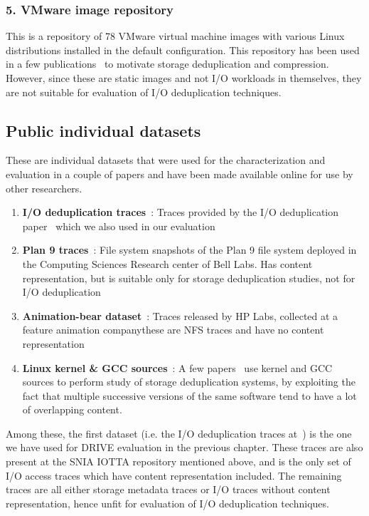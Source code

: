 \subsubsection{5. VMware image repository}
This is a repository of 78 VMware virtual machine images with various
Linux distributions installed in the default configuration. This 
repository has been used in a few publications~\cite{p-dedupe, ddelta} to
motivate storage deduplication and compression. However, since these
are static images and not I/O workloads in themselves, they are not
suitable for evaluation of I/O deduplication techniques.

\subsection{Public individual datasets}
These are individual datasets that were used for the 
characterization and evaluation in a couple of papers
and have been made available online for use by other researchers.
\begin{enumerate}
	\item \textbf{I/O deduplication traces}~\cite{iodedup-online}: Traces provided by the I/O deduplication paper~\cite{iodedup} which we also used in our evaluation
	\item \textbf{Plan 9 traces}~\cite{p9-traces}: File system snapshots of the Plan 9 file system deployed in the Computing Sciences Research center of Bell Labs. Has content representation, but is suitable only for storage deduplication studies, not for I/O deduplication
	\item \textbf{Animation-bear dataset}~\cite{animation-bear}: Traces released by HP Labs, collected at a feature animation company\textemdash{}these are NFS traces and have no content representation
	\item \textbf{Linux kernel \& GCC sources}~\cite{kernel-src, gcc-src}: A few papers~\cite{p-dedupe, ddelta} use kernel and GCC sources to perform study of storage deduplication systems, by exploiting the fact that multiple successive versions of the same software tend to have a lot of overlapping content.
\end{enumerate}

Among these, the first dataset (i.e. the I/O deduplication traces at~\cite{iodedup-online})
is the one we have used for DRIVE evaluation in the previous chapter. These
traces are also present at the SNIA IOTTA repository mentioned above, and 
is the only set of I/O access traces which have content representation included.
The remaining traces are all either storage metadata traces or I/O traces
without content representation, hence unfit for evaluation of I/O deduplication
techniques.

